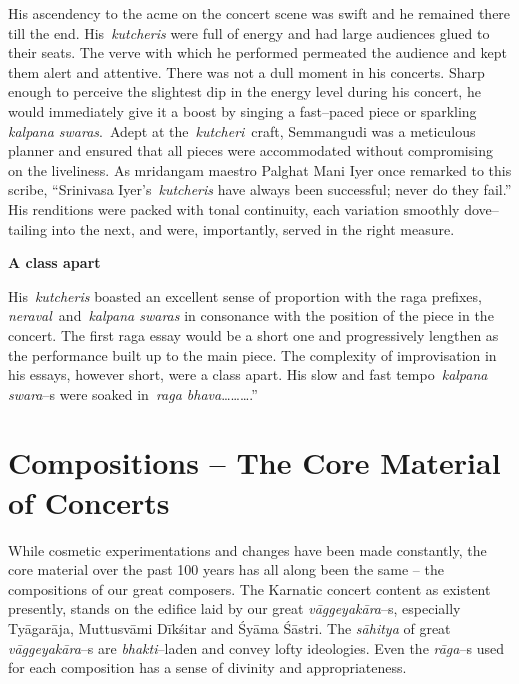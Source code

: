 \begin{myquote}
His ascendency to the acme on the concert scene was swift and he remained there till the end. His \textit{kutcheris} were full of energy and had large audiences glued to their seats. The verve with which he performed permeated the audience and kept them alert and attentive. There was not a dull moment in his concerts. Sharp enough to perceive the slightest dip in the energy level during his concert, he would immediately give it a boost by singing a fast–paced piece or sparkling \textit{kalpana swaras}. Adept at the \textit{kutcheri} craft, Semmangudi was a meticulous planner and ensured that all pieces were accommodated without compromising on the liveliness. As mridangam maestro Palghat Mani Iyer once remarked to this scribe, “Srinivasa Iyer’s \textit{kutcheris} have always been successful; never do they fail.” His renditions were packed with tonal continuity, each variation smoothly dove–tailing into the next, and were, importantly, served in the right measure.
\end{myquote}

\textbf{A class apart}

\begin{myquote}
His \textit{kutcheris} boasted an excellent sense of proportion with the raga prefixes, \textit{neraval} and \textit{kalpana swaras} in consonance with the position of the piece in the concert. The first raga essay would be a short one and progressively lengthen as the performance built up to the main piece. The complexity of improvisation in his essays, however short, were a class apart. His slow and fast tempo \textit{kalpana swara}–s were soaked in \textit{raga bhava}……….”
\end{myquote}


\section*{Compositions – The Core Material of Concerts}

While cosmetic experimentations and changes have been made constantly, the core material over the past 100 years has all along been the same – the compositions of our great composers. The Karnatic concert content as existent presently, stands on the edifice laid by our great \textit{vāggeyakāra}–s, especially Tyāgarāja, Muttusvāmi Dīkśitar and Śyāma Śāstri. The \textit{sāhitya} of great \textit{vāggeyakāra}–s are \textit{bhakti}–laden and convey lofty ideologies. Even the \textit{rāga}–s used for each composition has a sense of divinity and appropriateness.

